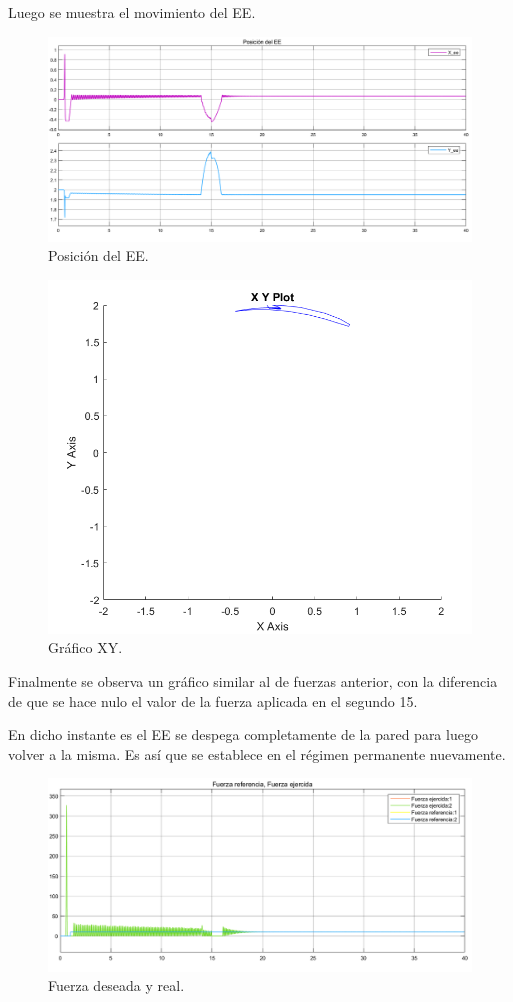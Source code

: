 Luego se muestra el movimiento del EE.
\begin{figure}[H]
	\centering
	\includegraphics[width=0.8\linewidth]{ImagenesControl de fuerza no lineal/2_3_f_b}
	\caption{Posición del EE.}	
	\label{fig:aposd_f}
\end{figure}

\begin{figure}[H]
	\centering
	\includegraphics[width=0.5\linewidth]{ImagenesControl de fuerza no lineal/2_3_f_c}
	\caption{Gráfico XY.}	
	\label{fig:bxyd_f}
\end{figure}

Finalmente se observa un gráfico similar al de fuerzas anterior, con la diferencia de que se hace nulo el valor de la fuerza aplicada en el segundo 15. 

En dicho instante es el EE se despega completamente de la pared para luego volver a la misma. Es así que se establece en el régimen permanente nuevamente.

\begin{figure}[H]
	\centering
	\includegraphics[width=0.8\linewidth]{ImagenesControl de fuerza no lineal/2_3_f_e}
	\caption{Fuerza deseada y real.}	
	\label{fig:bfd_f}
\end{figure}
%
